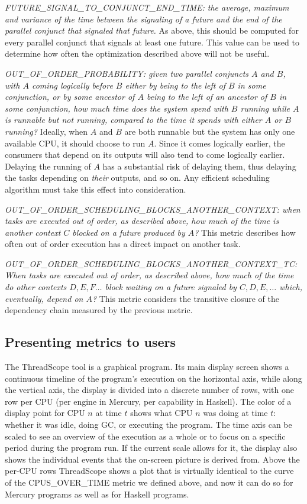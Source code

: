 \emph{FUTURE\_SIGNAL\_TO\_CONJUNCT\_END\_TIME:
the average, maximum and variance of the time
between the signaling of a future
and the end of the parallel conjunct that signaled that future.}
As above, this should be computed for
every parallel conjunct that signals at least one future.
This value can be used to determine
how often the optimization described above will not be useful.

\emph{OUT\_OF\_ORDER\_PROBABILITY:
given two parallel conjuncts $A$ and $B$,
with $A$ coming logically before $B$
either by being to the left of $B$ in some conjunction,
or by some ancestor of $A$ being to the left of an ancestor of $B$
in some conjunction,
how much time does the system spend with $B$ running
while $A$ is runnable but not running,
compared to the time it spends with either $A$ or $B$ running?}
Ideally, when $A$ and $B$ are both runnable
but the system has only one available CPU,
it should choose to run $A$.
Since it comes logically earlier,
the consumers that depend on its outputs
will also tend to come logically earlier.
Delaying the running of $A$ has a substantial risk of delaying them,
thus delaying the tasks depending on \emph{their} outputs, and so on.
Any efficient scheduling algorithm
must take this effect into consideration.

\emph{OUT\_OF\_ORDER\_SCHEDULING\_BLOCKS\_ANOTHER\_CONTEXT:
when tasks are executed out of order, as described above,
how much of the time is another context $C$
blocked on a future produced by $A$?}
This metric describes how often
out of order execution has a direct impact on another task.

\emph{OUT\_OF\_ORDER\_SCHEDULING\_BLOCKS\_ANOTHER\_CONTEXT\_TC:
When tasks are executed out of order, as described above,
how much of the time do other contexts $D, E, F\ldots$ block
waiting on a future signaled by $C, D, E, \ldots$
which, eventually, depend on $A$?}
This metric considers the transitive closure of the dependency chain
measured by the previous metric.

\subsection{Presenting metrics to users}

The ThreadScope tool is a graphical program.
Its main display screen shows
a continuous timeline of the program's execution on the horizontal axis,
while along the vertical axis,
the display is divided into a discrete number of rows,
with one row per CPU (per engine in Mercury, per capability in Haskell).
The color of a display point for CPU $n$ at time $t$
shows what CPU $n$ was doing at time $t$:
whether it was idle, doing GC, or executing the program.
The time axis can be scaled to see an overview of the execution as a whole
or to focus on a specific period during the program run.
If the current scale allows for it,
the display also shows the individual events
that the on-screen picture is derived from.
Above the per-CPU rows ThreadScope shows a plot that is virtually identical
to the curve of the CPUS\_OVER\_TIME metric we defined above,
and now it can do so for Mercury programs as well as for Haskell programs.

